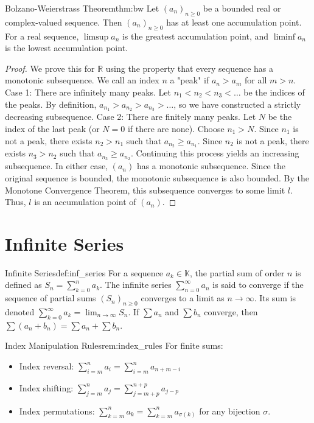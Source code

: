 \documentclass[11pt, a4paper]{article}
\begin{document}
\begin{theorem}{Bolzano-Weierstrass Theorem}{thm:bw}
Let $(a_n)_{n \ge 0}$ be a bounded real or complex-valued sequence. Then $(a_n)_{n \ge 0}$ has at least one accumulation point. For a real sequence, $\limsup a_n$ is the greatest accumulation point, and $\liminf a_n$ is the lowest accumulation point.
\end{theorem}
\begin{proof}
We prove this for $\mathbb{R}$ using the property that every sequence has a monotonic subsequence.
We call an index $n$ a "peak" if $a_n > a_m$ for all $m > n$.
Case 1: There are infinitely many peaks. Let $n_1 < n_2 < n_3 < \dots$ be the indices of the peaks. By definition, $a_{n_1} > a_{n_2} > a_{n_3} > \dots$, so we have constructed a strictly decreasing subsequence.
Case 2: There are finitely many peaks. Let $N$ be the index of the last peak (or $N=0$ if there are none). Choose $n_1 > N$. Since $n_1$ is not a peak, there exists $n_2 > n_1$ such that $a_{n_2} \ge a_{n_1}$. Since $n_2$ is not a peak, there exists $n_3 > n_2$ such that $a_{n_3} \ge a_{n_2}$. Continuing this process yields an increasing subsequence.
In either case, $(a_n)$ has a monotonic subsequence. Since the original sequence is bounded, the monotonic subsequence is also bounded.
By the Monotone Convergence Theorem, this subsequence converges to some limit $l$. Thus, $l$ is an accumulation point of $(a_n)$.
\end{proof}

\section{Infinite Series}

\begin{definition}{Infinite Series}{def:inf_series}
For a sequence $a_k \in \mathbb{K}$, the partial sum of order $n$ is defined as $S_n = \sum_{k=0}^n a_k$. The infinite series $\sum_{n=0}^{\infty} a_n$ is said to converge if the sequence of partial sums $(S_n)_{n \ge 0}$ converges to a limit as $n \to \infty$. Its sum is denoted $\sum_{k=0}^{\infty} a_k = \lim_{n \to \infty} S_n$. If $\sum a_n$ and $\sum b_n$ converge, then $\sum (a_n + b_n) = \sum a_n + \sum b_n$.
\end{definition}

\begin{remark}{Index Manipulation Rules}{rem:index_rules}
For finite sums: 
\begin{itemize}
    \item Index reversal: $\sum_{i=m}^n a_i = \sum_{i=m}^n a_{n+m-i}$
    \item Index shifting: $\sum_{j=m}^n a_j = \sum_{j=m+p}^{n+p} a_{j-p}$
    \item Index permutations: $\sum_{k=m}^n a_k = \sum_{k=m}^n a_{\sigma(k)}$ for any bijection $\sigma$.
\end{itemize}
\end{remark}
\end{document}
